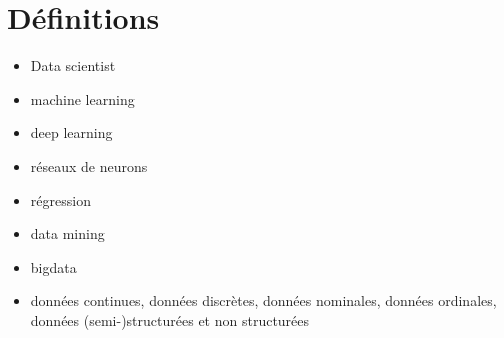 \def\xxactivite{Cours}
\def\xxauteur{\textsl{Xavier Pessoles}}

\fichefalse
\proftrue
\tdfalse
\courstrue

\def\xxnumchapitre{Chapitre 1 \vspace{.2cm}}
\def\xxchapitre{\hspace{.12cm} Introduction}

\def\xxcompetences{%
\textsl{%
\textbf{Savoirs et compétences :}\\
\begin{itemize}[label=\ding{112},font=\color{ocre}] 
\item A VOir
\end{itemize}
}}



\def\xxfigures{
}%

\iflivret

\else

\fi
\setlength{\columnseprule}{.1pt}

\vspace{2cm}
\pagestyle{fancy}
\thispagestyle{plain}


\section{Définitions}

\begin{itemize}
\item Data scientist
\item machine learning
\item deep learning
\item réseaux de neurons
\item régression
\item data mining
\item bigdata
\item données continues, données discrètes, données nominales, données ordinales, données (semi-)structurées et non structurées

\end{itemize}

